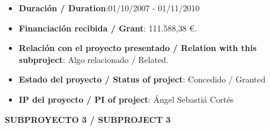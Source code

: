 \begin{enumerate}
\begin{itemize}
\item {\bf Duración / Duration}:01/10/2007 - 01/11/2010 
\item {\bf Financiación recibida / Grant}: 111.588,38 \euro. 
\item {\bf Relación con el proyecto presentado / Relation with this subproject}: Algo relacionado / Related. 
\item {\bf Estado del proyecto / Status of project}: Concedido / Granted
\item {\bf IP del proyecto / PI of project}: Ángel Sebastiá Cortés 
\end{itemize}
\end{enumerate}

\vspace{12pt}

\noindent\textbf{SUBPROYECTO 3 / SUBPROJECT 3}

